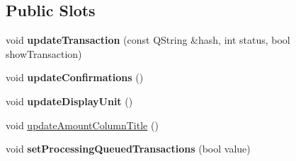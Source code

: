 \subsection*{Public Slots}
\begin{DoxyCompactItemize}
\item 
\mbox{\label{class_transaction_table_model_a8de43b3c7ba0612304906eb5a2f51a06}} 
void {\bfseries update\+Transaction} (const Q\+String \&hash, int status, bool show\+Transaction)
\item 
\mbox{\label{class_transaction_table_model_a5899d9eda6465bfb16d2846b6459567e}} 
void {\bfseries update\+Confirmations} ()
\item 
\mbox{\label{class_transaction_table_model_a8b73ff7d72ec2dd69790bc61bbe8575e}} 
void {\bfseries update\+Display\+Unit} ()
\item 
void \mbox{\hyperlink{class_transaction_table_model_acbb6e7531f507369ad18b656ad7b3f10}{update\+Amount\+Column\+Title}} ()
\item 
\mbox{\label{class_transaction_table_model_a9f8f2cdb61517ab04f880d416aa927c7}} 
void {\bfseries set\+Processing\+Queued\+Transactions} (bool value)
\end{DoxyCompactItemize}
